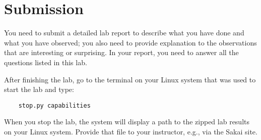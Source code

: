\section{Submission}

You need to submit a detailed lab report to describe what you have
done and what you have observed; you also need to provide explanation
to the observations that are interesting or surprising. In your report,
you need to answer all the questions listed in this lab.

After finishing the lab, go to the terminal on your Linux system that was used to start the lab and type:
\begin{verbatim}
    stop.py capabilities
\end{verbatim}
When you stop the lab, the system will display a path to the zipped lab results on your Linux system.  Provide that file to
your instructor, e.g., via the Sakai site.




